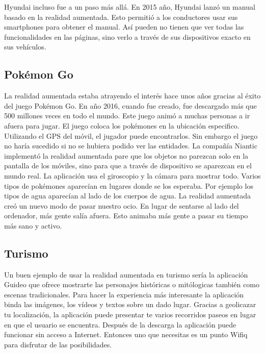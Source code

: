 \documentclass[a4paper,11pt]{scrartcl}
\begin{document}
\par Hyundai incluso fue a un paso más allá. En 2015 año, Hyundai lanzó un manual basado en la realidad aumentada\cite{hyundai}. Esto permitió a los conductores usar sus smartphones para obtener el manual. Así pueden no tienen que ver todas las funcionalidades en las páginas, sino verlo a través de sus dispositivos exacto en sus vehículos.


\subsection{Pokémon Go}
La realidad aumentada estaba atrayendo el interés hace unos años gracias al éxito del juego Pokémon Go. En año 2016, cuando fue creado, fue descargado más que 500 millones veces en todo el mundo. Este juego animó a muchas personas a ir afuera para jugar. El juego coloca los pokémones en la ubicación especifico. Utilizando el GPS del móvil, el jugador puede encontrarlos. Sin embargo el juego no haría sucedido si no se hubiera podido ver las entidades. La compañía Niantic implementó la realidad aumentada pare que los objetos no parezcan solo en la pantalla de los móviles, sino para que a través de dispositivo se aparezcan en el mundo real. La aplicación usa el giroscopio y la cámara para mostrar todo. Varios tipos de pokémones aparecían en lugares donde se los esperaba. Por ejemplo los tipos de agua aparecían al lado de los cuerpos de agua. La realidad aumentada creó un nuevo modo de pasar nuestro ocio. En lugar de sentarse al lado del ordenador, más gente salía afuera. Esto animaba más gente a pasar su tiempo más sano y activo.

\subsection{Turismo}
Un buen ejemplo de usar la realidad aumentada en turismo sería la aplicación Guideo\cite{guideo} que ofrece mostrarte las personajes históricas o mitólogicas también como escenas tradicionales. Para hacer la experiencia más interesante la aplicación binda las imágenes, los vídeos y textos sobre un dado lugar. Gracias a geolicazar tu localización, la aplicación puede presentar te varios recorridos paseos en lugar en que el usuario se encuentra. Después de la descarga la aplicación puede funcionar sin acceso a Internet. Entonces uno que necesitas es un punto Wifiq para disfrutar de las posibilidades.
\end{document}

